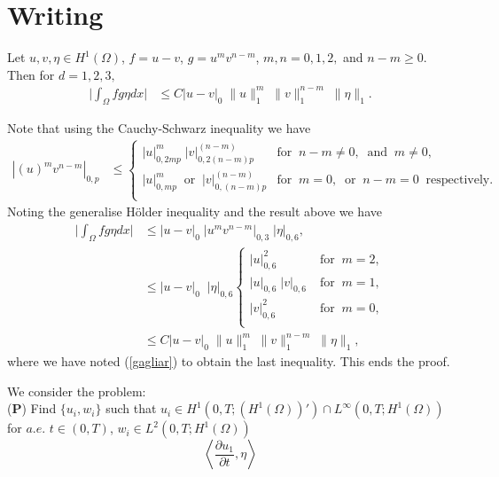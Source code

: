 \section{Writing}

\begin{Lem}\label{Lem201}
Let $u,v,\eta \in H^1{(\Omega)}$, $f=u-v$, $g=u^m v^{n-m}$, $m,n=0,1,2,$ and $n-m\geq
0$. Then for $d=1,2,3,$
\begin{align}
\bigg| \int_\Omega f g \eta dx \bigg| &\leq C |u-v|_0\; \|u\|_1^m\; \|v\|_1^{n-m}\; \|\eta\|_1.
\label{2le000}
\end{align}
\end{Lem}
\bproof
Note that using the Cauchy-Schwarz inequality we have
\begin{align*}
|(u)^m v^{n-m}|_{0,p}&\leq
\begin{cases}
|u|_{0,2mp}^m \;|v|_{0,2(n-m)p}^{(n-m)}&\mbox{for}\;\;
 n-m\neq 0,\;\;\mbox{and}\;\; m\neq 0,\\
|u|_{0,mp}^m \;\;\mbox{or}\;\;|v|_{0,(n-m)p}^{(n-m)}&\mbox{for}\;\;
 m= 0,\;\;\mbox{or}\;\; n-m= 0\;\;\mbox{respectively}.\\
\end{cases}
\end{align*}
Noting the  generalise H\"older inequality  and the result above we have
\begin{align*}
\bigg| \int_\Omega f g \eta dx \bigg| 
&\leq |u-v|_0\;|u^m v^{n-m}|_{0,3}\;|\eta|_{0,6},\\
&\leq |u-v|_0\;\;|\eta|_{0,6}
\begin{cases}
|u|_{0,6}^2\;&\mbox{for}\;\;m=2,\\
|u|_{0,6}\;|v|_{0,6} \;&\mbox{for}\;\;m=1,\\
|v|_{0,6}^2 \;&\mbox{for}\;\;m=0,\\
\end{cases}\\
&\leq C |u-v|_0\; \|u\|_1^m\; \|v\|_1^{n-m}\; \|\eta\|_1,
\end{align*}
where we have noted (\ref{gagliar}) to obtain the last inequality.
This ends the proof.\eproof

We consider the problem: \\
({\textbf P}) \quad Find
$\{u_i, w_i\}$  such that $u_i \in
H^1(0,T;(H^1(\Omega))')\cap L^\infty(0,T;H^1(\Omega))$ for $a.e.$\; $t\in(0,T)$, $ w_i \in L^2(0,T;H^1(\Omega))$ 
$$\left \langle\frac{\partial u_{1}}{\partial t},\eta \right\rangle$$













